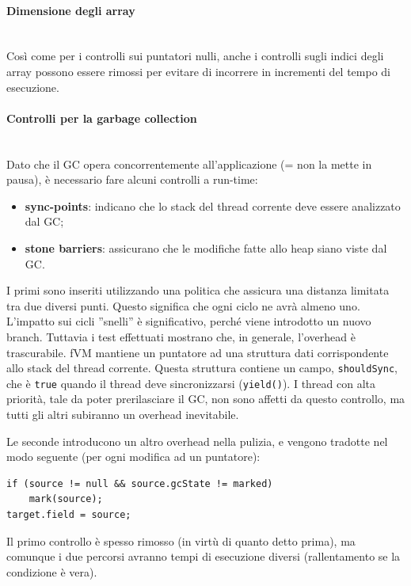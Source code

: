 \paragraph{Dimensione degli array} \mbox{} \\
Così come per i controlli sui puntatori nulli, anche i controlli sugli indici degli array possono essere rimossi per evitare di incorrere in incrementi del tempo di esecuzione.

\paragraph{Controlli per la garbage collection} \mbox{} \\
Dato che il GC opera concorrentemente all'applicazione (= non la mette in pausa), è necessario fare alcuni controlli a run-time:
\begin{itemize}
	\item \textbf{sync-points}: indicano che lo stack del thread corrente deve essere analizzato dal GC;
	\item \textbf{stone barriers}: assicurano che le modifiche fatte allo heap siano viste dal GC.
\end{itemize}
I primi sono inseriti utilizzando una politica che assicura una distanza limitata tra due diversi punti. Questo significa che ogni ciclo ne avrà almeno uno. L'impatto sui cicli ''snelli'' è significativo, perché viene introdotto un nuovo branch. Tuttavia i test effettuati mostrano che, in generale, l'overhead è trascurabile. fVM mantiene un puntatore ad una struttura dati corrispondente allo stack del thread corrente. Questa struttura contiene un campo, \texttt{shouldSync}, che è \texttt{true} quando il thread deve sincronizzarsi (\texttt{yield()}). I thread con alta priorità, tale da poter prerilasciare il GC, non sono affetti da questo controllo, ma tutti gli altri subiranno un overhead inevitabile. 

Le seconde introducono un altro overhead nella pulizia, e vengono tradotte nel modo seguente (per ogni modifica ad un puntatore):
\begin{lstlisting}[caption={Stone-barrier},label={lst:stone}]
if (source != null && source.gcState != marked)
	mark(source);
target.field = source;
\end{lstlisting}
Il primo controllo è spesso rimosso (in virtù di quanto detto prima), ma comunque i due percorsi avranno tempi di esecuzione diversi (rallentamento se la condizione è vera).

